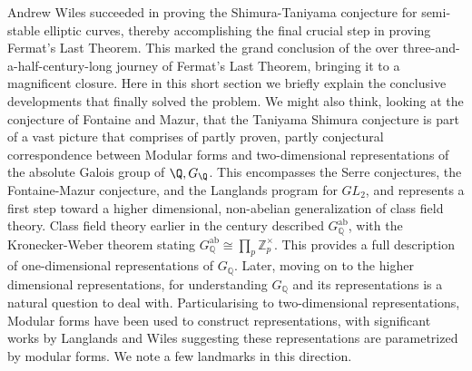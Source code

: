 Andrew Wiles succeeded in proving the Shimura-Taniyama conjecture for semi-stable elliptic curves, thereby accomplishing the final crucial step in proving Fermat’s Last Theorem. This marked the grand conclusion of the over three-and-a-half-century-long journey of Fermat’s Last Theorem, bringing it to a magnificent closure. Here in this short section we briefly explain the conclusive developments that finally solved the problem. We might also think, looking at the conjecture of Fontaine and Mazur, that the Taniyama Shimura conjecture is part of a vast picture that comprises of partly proven, partly conjectural correspondence between Modular forms and two-dimensional representations of the absolute Galois group of $\Q, G_{\Q}$. This encompasses the Serre conjectures, the Fontaine-Mazur conjecture, and the Langlands program for $G L_{2}$, and represents a first step toward a higher dimensional, non-abelian generalization of class field theory. Class field theory earlier in the century described \( G_{\mathbb{Q}}^{\mathrm{ab}} \), with the Kronecker-Weber theorem stating \( G_{\mathbb{Q}}^{\mathrm{ab}} \cong \prod_{p} \mathbb{Z}_{p}^{\times} \). This provides a full description of one-dimensional representations of \( G_{\mathbb{Q}} \). Later, moving on to the higher dimensional representations, for understanding \( G_{\mathbb{Q}} \) and its representations is a natural question to deal with. Particularising to two-dimensional representations,  Modular forms have been used to construct representations, with significant works by Langlands and Wiles suggesting these representations are parametrized by modular forms. We note a few landmarks in this direction. \\

